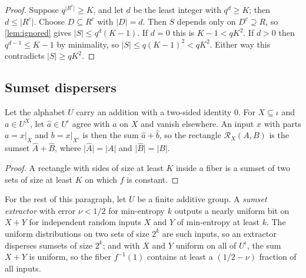 \documentclass[11pt]{article}
\newcommand{\leanrefs}[1]{{\unskip\nobreak\hfil\penalty50\hskip1em\null\nobreak\hfil
  {\normalfont\small #1}\parfillskip=0pt\finalhyphendemerits=0\par}}
\newcommand{\leanref}[1]{\leanrefs{\lean{#1}}}
\theoremstyle{plain}
\theoremstyle{definition}
\theoremstyle{remark}
\newcommand{\rect}{\mathcal{R}}
\newcommand{\restr}[2]{#1|_{#2}}
\newcommand{\card}[1]{\lvert #1\rvert}
\begin{document}
\begin{proof}
Suppose $q^{\card{R^c}} \ge K$, and let $d$ be the least integer with $q^d \ge K$; then
$d \le \card{R^c}$. Choose $D \subseteq R^c$ with $\card D = d$. Then $S$ depends only on
$D^c \supseteq R$, so \cref{lem:ignored} gives $\card S \le q^d (K-1)$. If $d = 0$ this is
$K - 1 < qK^2$. If $d > 0$ then $q^{d-1} \le K - 1$ by minimality, so
$\card S \le q(K-1)^2 < qK^2$. Either way this contradicts $\card S \ge qK^2$.
\end{proof}

\subsection{Sumset dispersers}
\label{sec:dispersers}

Let the alphabet $U$ carry an addition with a two-sided identity $0$.
For $X \subseteq \iota$ and $a \in U^X$, let
$\hat a \in U^\iota$ agree with $a$ on $X$ and vanish elsewhere. An input $x$ with parts
$a = \restr{x}{X}$ and $b = \restr{x}{X^c}$ is then the sum $\hat a + \hat b$, so the rectangle
$\rect_X(A, B)$ is the sumset $\hat A + \hat B$, where $\card{\hat A} = \card A$ and
$\card{\hat B} = \card B$.



\begin{proof}
A rectangle with sides of size at least $K$ inside a fiber is a sumset of two sets of size at
least $K$ on which $f$ is constant.
\end{proof}

For the rest of this paragraph, let $U$ be a finite additive group.
A \emph{sumset extractor} with error $\nu < 1/2$ for min-entropy $k$ outputs a nearly uniform bit
on $X + Y$ for independent random inputs $X$ and $Y$ of min-entropy at least $k$. The uniform
distributions on two sets of size $2^k$ are such inputs, so an extractor disperses sumsets of
size $2^k$; and with $X$ and $Y$ uniform on all of $U^\iota$, the sum $X + Y$ is uniform, so the
fiber $f^{-1}(1)$ contains at least a $(1/2 - \nu)$ fraction of all inputs.
\end{document}
